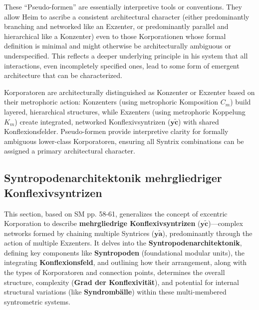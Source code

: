 \documentclass[12pt]{article}
\newcommand{\q}[1]{\enquote{#1}}
\newcommand{\syntrix}{\bm{y\widetilde{a}}}
\newcommand{\konflexivsyntrix}{\bm{y\widetilde{c}}}
\begin{document}
\begin{itemize}
\begin{itemize}
    \end{itemize}
    These \q{Pseudo-formen} are essentially interpretive tools or conventions. They allow Heim to ascribe a consistent architectural character (either predominantly branching and networked like an Exzenter, or predominantly parallel and hierarchical like a Konzenter) even to those Korporationen whose formal definition is minimal and might otherwise be architecturally ambiguous or underspecified. This reflects a deeper underlying principle in his system that all interactions, even incompletely specified ones, lead to some form of emergent architecture that can be characterized.
\end{itemize}

Korporatoren are architecturally distinguished as Konzenter or Exzenter based on their metrophoric action: Konzenters (using metrophoric Komposition \(C_m\)) build layered, hierarchical structures, while Exzenters (using metrophoric Koppelung \(K_m\)) create integrated, networked Konflexivsyntrizen (\(\konflexivsyntrix\)) with shared Konflexionsfelder. Pseudo-formen provide interpretive clarity for formally ambiguous lower-class Korporatoren, ensuring all Syntrix combinations can be assigned a primary architectural character.

\subsection{Syntropodenarchitektonik mehrgliedriger Konflexivsyntrizen}
\label{sec:syntropoden}

This section, based on SM pp. 58-61, generalizes the concept of excentric Korporation to describe \textbf{mehrgliedrige Konflexivsyntrizen} (\(\konflexivsyntrix\))—complex networks formed by chaining multiple Syntrices (\(\syntrix\)), predominantly through the action of multiple Exzenters. It delves into the \textbf{Syntropodenarchitektonik}, defining key components like \textbf{Syntropoden} (foundational modular units), the integrating \textbf{Konflexionsfeld}, and outlining how their arrangement, along with the types of Korporatoren and connection points, determines the overall structure, complexity (\textbf{Grad der Konflexivität}), and potential for internal structural variations (like \textbf{Syndrombälle}) within these multi-membered syntrometric systems.
\end{document}
